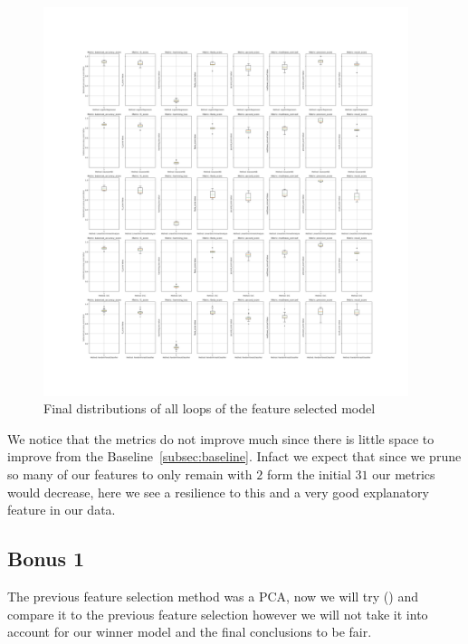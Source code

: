 \documentclass[12pt, a4paper]{article}
\begin{document}
\begin{figure}[H]
    \begin{center}
        \includegraphics[width=0.95\textwidth]{figures/RNCV/FeatureSelection/All loop outer folds boxplots.png}
        \caption{Final distributions of all loops of the feature selected model}\label{fig:fs model desc}
    \end{center}
\end{figure}

\begin{multicols}{2}

    We notice that the metrics do not improve much since there is little space to improve from the Baseline~\ref{subsec:baseline}. Infact we expect that since we prune so many of our features to only remain with $2$ form the initial $31$ our metrics would decrease, here we see a resilience to this and a very good explanatory feature in our data.
    \newlin

    \subsection{Bonus 1} \label{subsec:bonus}

    The previous feature selection method was a PCA, now we will try () and compare it to the previous feature selection however we will not take it into account for our winner model and the final conclusions to be fair.
    \newline

\end{multicols}
\end{document}
